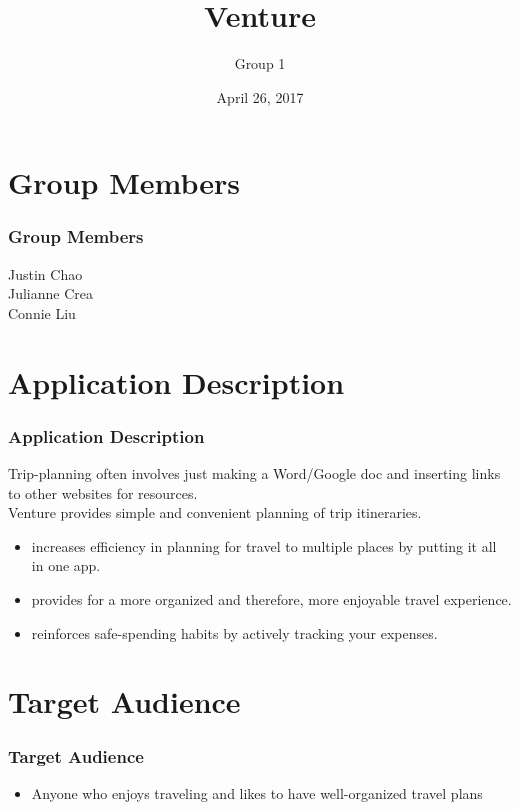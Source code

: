 \documentclass{beamer}
\title{Venture}
\author{Group 1}
\institute{CS 329E \\ The University of Texas at Austin}
\date{April 26, 2017}
\begin{document}
\frame{\titlepage}

\section{Group Members}
\begin{frame}
\frametitle{Group Members}
    \begin{center}
        Justin Chao \\
        Julianne Crea \\
        Connie Liu 
    \end{center}
\end{frame}

\section{Application Description}
\begin{frame}
\frametitle{Application Description}
        Trip-planning often involves just making a Word/Google doc and inserting links to
            other websites for resources. \\ 
        Venture provides simple and convenient planning of trip itineraries.
    \begin{itemize}
        \item increases efficiency in planning for travel to multiple places by putting it all in
            one app.
        \item provides for a more organized and therefore, more enjoyable travel experience.
        \item reinforces safe-spending habits by actively tracking your expenses.
    \end{itemize}
\end{frame}

\section{Target Audience}
\begin{frame}
\frametitle{Target Audience}
    \begin{itemize}
        \item Anyone who enjoys traveling and likes to have well-organized travel plans
    \end{itemize}
\end{frame}
\end{document}
